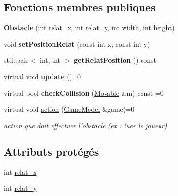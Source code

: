 \subsection*{Fonctions membres publiques}
\begin{DoxyCompactItemize}
\item 
\hypertarget{class_obstacle_a68f97d72f34b3ea31ebf1fcec6d988cc}{{\bfseries Obstacle} (int \hyperlink{class_obstacle_a37056563c8469b38aa240c7c423d7280}{relat\+\_\+x}, int \hyperlink{class_obstacle_a754f463db00e74fd5d66a758e4458c26}{relat\+\_\+y}, int \hyperlink{class_movable_a7e4607cccfcc96d2007c2e39c44cab54}{width}, int \hyperlink{class_movable_a192073065bc62d054f259c3b1522c09e}{height})}\label{class_obstacle_a68f97d72f34b3ea31ebf1fcec6d988cc}

\item 
\hypertarget{class_obstacle_a1afc602bb15c81ec47fac3b300f69e18}{void {\bfseries set\+Position\+Relat} (const int x, const int y)}\label{class_obstacle_a1afc602bb15c81ec47fac3b300f69e18}

\item 
\hypertarget{class_obstacle_a48ac0fd66bc7ad139ad442ac30d8de4b}{std\+::pair$<$ int, int $>$ {\bfseries get\+Relat\+Position} () const }\label{class_obstacle_a48ac0fd66bc7ad139ad442ac30d8de4b}

\item 
\hypertarget{class_obstacle_a7596b666ccd08cd6b0655b1aa4b922ed}{virtual void {\bfseries update} ()=0}\label{class_obstacle_a7596b666ccd08cd6b0655b1aa4b922ed}

\item 
\hypertarget{class_obstacle_adcc769692b2ca8fe081645c86bbb0a81}{virtual bool {\bfseries check\+Collision} (\hyperlink{class_movable}{Movable} \&m) const =0}\label{class_obstacle_adcc769692b2ca8fe081645c86bbb0a81}

\item 
\hypertarget{class_obstacle_a26321906015b3cb1c62fa9e90ea51727}{virtual void \hyperlink{class_obstacle_a26321906015b3cb1c62fa9e90ea51727}{action} (\hyperlink{class_game_model}{Game\+Model} \&game)=0}\label{class_obstacle_a26321906015b3cb1c62fa9e90ea51727}

\begin{DoxyCompactList}\small\item\em action que doit effectuer l'obstacle (ex \+: tuer le joueur) \end{DoxyCompactList}\end{DoxyCompactItemize}
\subsection*{Attributs protégés}
\begin{DoxyCompactItemize}
\item 
int \hyperlink{class_obstacle_a37056563c8469b38aa240c7c423d7280}{relat\+\_\+x}
\item 
int \hyperlink{class_obstacle_a754f463db00e74fd5d66a758e4458c26}{relat\+\_\+y}
\end{DoxyCompactItemize}


